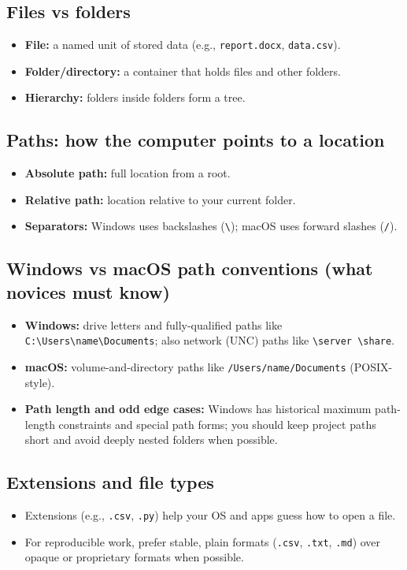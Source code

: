 \subsection{Files vs folders}
\begin{itemize}
\item \textbf{File:} a named unit of stored data (e.g., \texttt{report.docx}, \texttt{data.csv}).
\item \textbf{Folder/directory:} a container that holds files and other folders.
\item \textbf{Hierarchy:} folders inside folders form a tree.
\end{itemize}

\subsection{Paths: how the computer points to a location}
\begin{itemize}
\item \textbf{Absolute path:} full location from a root.
\item \textbf{Relative path:} location relative to your current folder.
\item \textbf{Separators:} Windows uses backslashes (\texttt{\textbackslash}); macOS uses forward slashes (\texttt{/}).
\end{itemize}

\subsection{Windows vs macOS path conventions (what novices must know)}
\begin{itemize}
\item \textbf{Windows:} drive letters and fully-qualified paths like \texttt{C:\textbackslash Users\textbackslash name\textbackslash Documents}; also network (UNC) paths like \texttt{\textbackslash server \textbackslash share}.
\item \textbf{macOS:} volume-and-directory paths like \texttt{/Users/name/Documents} (POSIX-style).
\item \textbf{Path length and odd edge cases:} Windows has historical maximum path-length constraints and special path forms; you should keep project paths short and avoid deeply nested folders when possible.
\end{itemize}

\subsection{Extensions and file types}
\begin{itemize}
\item Extensions (e.g., \texttt{.csv}, \texttt{.py}) help your OS and apps guess how to open a file.
\item For reproducible work, prefer stable, plain formats (\texttt{.csv}, \texttt{.txt}, \texttt{.md}) over opaque or proprietary formats when possible.
\end{itemize}

